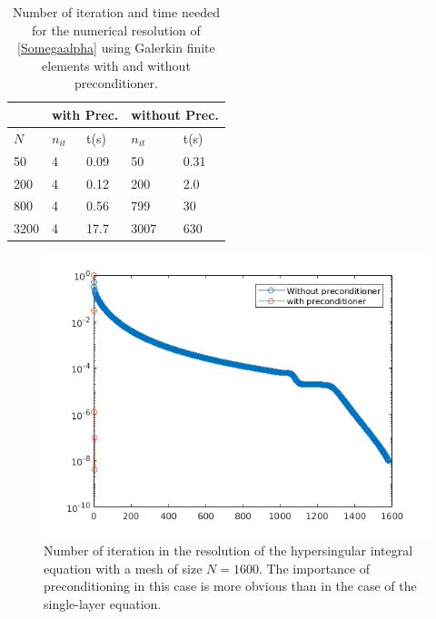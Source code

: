 \documentclass[a4paper]{article}
\begin{document}
\begin{table}[H]
	\begin{center}
		\begin{tabular}{|| m{4em} | m{4em} | m{4em} | m{4em} | m{4em}||} 
			\hline
			\multicolumn{1}{||c|}{ }&
			\multicolumn{2}{c|}{with Prec.}&\multicolumn{2}{c||}{without Prec.}\\
			\hline
			$N$ & $n_{it}$& t(s) & $n_{it}$ & t(s)\\
			\hline\hline
			50 & 4 & 0.09 & 50 & 0.31\\
			\hline
			200 & 4 & 0.12 & 200 & 2.0\\
			\hline
			800 & 4 & 0.56 & 799 & 30 \\
			\hline
			3200 & 4 & 17.7 & 3007 & 630\\
			\hline
		\end{tabular}
	\end{center}
	\caption{Number of iteration and time needed for the numerical resolution of \eqref{Somegaalpha} using Galerkin finite elements with and without preconditioner.}
	\label{TableNitTimeLaplaceNeumann}
\end{table}
\vspace{-0.7cm}
\begin{figure}[H]
	\centering
	\includegraphics[scale=0.5]{../figs/PrecondNeumannLaplaceSeg.png}
	\caption{Number of iteration in the resolution of the hypersingular  integral equation with a mesh of size $N = 1600$. The importance of preconditioning in this case is more obvious than in the case of the single-layer equation.}
	\label{FigureNitLaplaceNeumann}
\end{figure}
\end{document}

